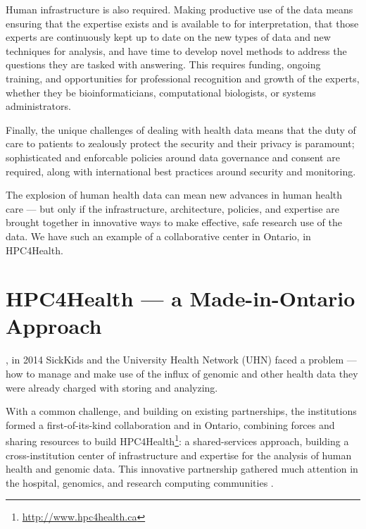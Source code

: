 \documentclass[twoside,symmetric,sfsidenotes,notoc]{tufte-book}
\begin{document}
Human infrastructure is also required.  Making productive use of the 
data means ensuring that the expertise exists and is available to for interpretation,
that those experts are continuously kept up to date on the new types of data
and new techniques for analysis, and have time to develop novel methods to address
the questions they are tasked with answering.  This requires funding, ongoing training,
and opportunities for professional recognition and growth of the experts, whether
they be bioinformaticians, computational biologists, or systems administrators.

Finally, the unique challenges of dealing with health data means that the duty
of care to patients to zealously protect the security and their privacy is
paramount; sophisticated and enforcable policies around data governance and consent
are required, along with international best practices around security and monitoring.

The explosion of human health data can mean new advances in human health care ---
but only if the infrastructure, architecture, policies, and expertise are brought
together in innovative ways to make effective, safe research use of the data.
We have such an example of a collaborative center in Ontario, in HPC4Health.

\chapter{HPC4Health --- a Made-in-Ontario Approach}
\label{ch:hpc4health}

, in 2014 SickKids and 
the University Health Network (UHN) faced a problem --- how to manage and make use of the influx 
of genomic and other health data they were already charged with storing and analyzing.

With a common challenge, and building on existing partnerships, the institutions formed a
first-of-its-kind collaboration and in Ontario, combining forces and sharing
resources to build HPC4Health\footnote{\url{http://www.hpc4health.ca}}: a
shared-services approach, building a cross-institution center
of infrastructure and expertise
for the analysis of human health and genomic data.  This innovative 
partnership gathered much attention in the hospital, genomics, and 
research computing communities \citep{hn-hpc4health, gw-hpc4health, inside-hpc-h4h-mellanox, openstack-hpc}.
\end{document}
